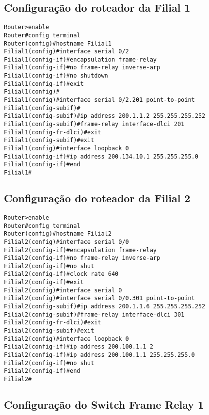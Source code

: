 \documentclass[]{article}
\begin{document}
\subsection{Configuração do roteador da Filial
1}\label{configurauxe7uxe3o-do-roteador-da-filial-1}

\begin{verbatim}
Router>enable
Router#config terminal
Router(config)#hostname Filial1
Filial1(config)#interface serial 0/2
Filial1(config-if)#encapsulation frame-relay
Filial1(config-if)#no frame-relay inverse-arp
Filial1(config-if)#no shutdown
Filial1(config-if)#exit
Filial1(config)#
Filial1(config)#interface serial 0/2.201 point-to-point
Filial1(config-subif)#
Filial1(config-subif)#ip address 200.1.1.2 255.255.255.252
Filial1(config-subif)#frame-relay interface-dlci 201
Filial1(config-fr-dlci)#exit
Filial1(config-subif)#exit
Filial1(config)#interface loopback 0
Filial1(config-if)#ip address 200.134.10.1 255.255.255.0
Filial1(config-if)#end
Filial1#
\end{verbatim}

\subsection{Configuração do roteador da Filial
2}\label{configurauxe7uxe3o-do-roteador-da-filial-2}

\begin{verbatim}
Router>enable
Router#config terminal
Router(config)#hostname Filial2
Filial2(config)#interface serial 0/0
Filial2(config-if)#encapsulation frame-relay
Filial2(config-if)#no frame-relay inverse-arp
Filial2(config-if)#no shut
Filial2(config-if)#clock rate 640
Filial2(config-if)#exit
Filial2(config)#interface serial 0
Filial2(config)#interface serial 0/0.301 point-to-point
Filial2(config-subif)#ip address 200.1.1.6 255.255.255.252
Filial2(config-subif)#frame-relay interface-dlci 301
Filial2(config-fr-dlci)#exit
Filial2(config-subif)#exit
Filial2(config)#interface loopback 0
Filial2(config-if)#ip address 200.100.1.1 2
Filial2(config-if)#ip address 200.100.1.1 255.255.255.0
Filial2(config-if)#no shut
Filial2(config-if)#end
Filial2#
\end{verbatim}

\subsection{Configuração do Switch Frame Relay
1}\label{configurauxe7uxe3o-do-switch-frame-relay-1}
\end{document}
